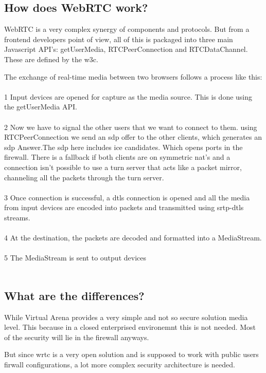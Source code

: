 \subsection{How does WebRTC work?}
WebRTC is a very complex synergy of components and protocols. But from a frontend developers point of view, all of this is packaged into three main Javascript API's: getUserMedia, RTCPeerConnection and RTCDataChannel. These are defined by the \gls{w3c}. 

The exchange of real-time media between two browsers follows a process like this:
\\
\\
1 Input devices are opened for capture as the media source. This is done using the getUserMedia API.
\\
\\
2 Now we have to signal the other users that we want to connect to them. using RTCPeerConnection we send an \gls{sdp} offer to the other clients, which generates an \gls{sdp} Answer.The \gls{sdp} here includes \gls{ice} candidates. Which opens ports in the firewall. There is a fallback if both clients are on symmetric \gls{nat}'s and a connection isn't possible to use a \gls{turn} server that acts like a packet mirror, channeling all the packets through the \gls{turn} server.
\\
\\
3 Once connection is successful, a \gls{dtls} connection is opened and all the media from input devices are encoded into packets and transmitted using \gls{srtp}-\gls{dtls} streams.
\\
\\
4 At the destination, the packets are decoded and formatted into a MediaStream.
\\
\\
5 The MediaStream is sent to output devices
\\
\\

\subsection{What are the differences?}
While Virtual Arena provides a very simple and not so secure solution media level. This because in a closed enterprised environemnt this is not needed. Most of the security will lie in the firewall anyways.

But since \gls{wrtc} is a very open solution and is supposed to work with public users firwall configurations, a lot more complex security architecture is needed.

